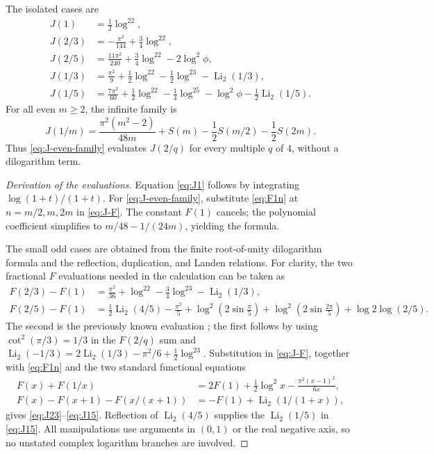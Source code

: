 \documentclass[11pt]{article}
\numberwithin{equation}{section}
\theoremstyle{definition}
\theoremstyle{remark}
\DeclareMathOperator{\Li}{Li}
\begin{document}
The isolated cases are
\begin{align}
 J(1)&=\tfrac12\log^22,\label{eq:J1}\\
 J(2/3)&=-\frac{\pi^2}{144}+\frac34\log^22,\label{eq:J23}\\
 J(2/5)&=\frac{11\pi^2}{240}+\frac34\log^22-2\log^2\phi,
 \label{eq:J25}\\
 J(1/3)&=\frac{\pi^2}{9}+\frac12\log^22-\frac12\log^23
          -\Li_2(1/3),\label{eq:J13}\\
 J(1/5)&=\frac{7\pi^2}{60}+\frac12\log^22-\frac14\log^25
          -\log^2\phi-\frac12\Li_2(1/5).\label{eq:J15}
\end{align}
For all even $m\ge2$, the infinite family is
\begin{equation}\label{eq:J-even-family}
 \boxed{\displaystyle
 J(1/m)=\frac{\pi^2(m^2-2)}{48m}
       +S(m)-\frac12S(m/2)-\frac12S(2m).}
\end{equation}
Thus \eqref{eq:J-even-family} evaluates $J(2/q)$ for every multiple
$q$ of $4$, without a dilogarithm term.

\begin{proof}[Derivation of the evaluations]
Equation \eqref{eq:J1} follows by integrating
$\log(1+t)/(1+t)$. For \eqref{eq:J-even-family}, substitute
\eqref{eq:F1n} at $n=m/2,m,2m$ in \eqref{eq:J-F}. The constant
$F(1)$ cancels; the polynomial coefficient simplifies to
$m/48-1/(24m)$, yielding the formula.

The small odd cases are obtained from the finite root-of-unity
dilogarithm formula and the reflection, duplication, and Landen
relations. For clarity, the two fractional $F$ evaluations needed in
the calculation can be taken as
\begin{align*}
 F(2/3)-F(1)
  &=\frac{\pi^2}{36}+\log^22-\frac34\log^23-\Li_2(1/3),\\
 F(2/5)-F(1)
  &=\tfrac12\Li_2(4/5)-\frac{\pi^2}{5}
    +\log^2\!\left(2\sin\frac\pi5\right)
    +\log^2\!\left(2\sin\frac{2\pi}5\right)
    +\log2\log(2/5).
\end{align*}
The second is the previously known evaluation \cite{RZ}; the first
follows by using $\cot^2(\pi/3)=1/3$ in the $F(2/q)$ sum and
$\Li_2(-1/3)=2\Li_2(1/3)-\pi^2/6+\tfrac12\log^23$.
Substitution in \eqref{eq:J-F}, together with \eqref{eq:F1n} and
the two standard functional equations
\begin{align*}
 F(x)+F(1/x)&=2F(1)+\tfrac12\log^2x
                 -\frac{\pi^2(x-1)^2}{6x},\\
 F(x)-F(x+1)-F(x/(x+1))&=-F(1)+\Li_2(1/(1+x)),
\end{align*}
gives \eqref{eq:J23}--\eqref{eq:J15}. Reflection of
$\Li_2(4/5)$ supplies the $\Li_2(1/5)$ in \eqref{eq:J15}.
All manipulations use arguments in $(0,1)$ or the real negative axis,
so no unstated complex logarithm branches are involved.
\end{proof}
\end{document}
